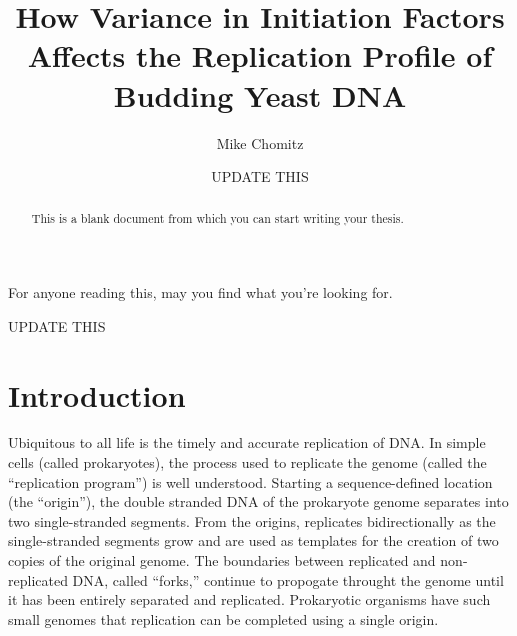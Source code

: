 \documentclass[serif]{sfuthesis}
\title{How Variance in Initiation Factors Affects the Replication Profile of Budding Yeast DNA}
\author{Mike Chomitz}
\date{UPDATE THIS}
\begin{document}
\frontmatter
\maketitle %
\makecommittee %
\makecopyrightdeclaration %

\begin{abstract}
	This is a blank document from which you can start writing your thesis.
\end{abstract}


\begin{dedication} %
	For anyone reading this, may you find what you're looking for.
\end{dedication}


\begin{acknowledgements} %
	UPDATE THIS
\end{acknowledgements}

\tableofcontents\clearpage
{}\listoftables\clearpage
{}\listoffigures





%
%

\mainmatter%

\chapter{Introduction}

Ubiquitous to all life is the timely and accurate replication of DNA.
In simple cells (called prokaryotes), the process used to replicate the genome (called the ``replication program'') is well understood.
Starting a sequence-defined location (the ``origin''), the double stranded DNA of the prokaryote genome separates into two single-stranded segments.
From the origins, replicates bidirectionally as the single-stranded segments grow and are used as templates for the creation of two copies of the original genome.
The boundaries between replicated and non-replicated DNA, called ``forks,'' continue to propogate throught the genome until it has been entirely separated and replicated.
Prokaryotic organisms have such small genomes that replication can be completed using a single origin.\cite{MolecularCellBiology}
\end{document}
